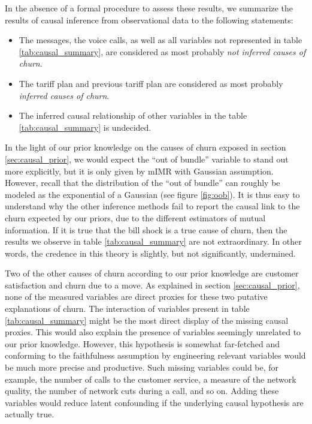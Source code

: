 In the absence of a formal procedure to assess these results, we summarize the
results of causal inference from observational data to the following statements:

\begin{itemize}
    \item The  messages, the voice calls, as well as all variables not
    represented in table \ref{tab:causal_summary}, are considered as most
    probably \emph{not inferred causes of churn}.
    \item The tariff plan and previous tariff plan are considered as most
    probably \emph{inferred causes of churn}.
    \item The inferred causal relationship of other variables in the table
    \ref{tab:causal_summary} is undecided.
\end{itemize}

In the light of our prior knowledge on the causes of churn exposed in section
\ref{sec:causal_prior}, we would expect the ``out of bundle'' variable to stand
out more explicitly, but it is only given by mIMR with Gaussian assumption.
However, recall that the distribution of the ``out of bundle'' can roughly be
modeled as the exponential of a Gaussian (see figure \ref{fig:oob}). It is thus
easy to understand why the other inference methods fail to report the causal
link to the churn expected by our priors, due to the different estimators of
mutual information. If it is true that the bill shock is a true cause of churn,
then the results we observe in table \ref{tab:causal_summary} are not
extraordinary. In other words, the credence in this theory is slightly, but not
significantly, undermined.

Two of the other causes of churn according to our prior knowledge are customer
satisfaction and churn due to a move. As explained in section
\ref{sec:causal_prior}, none of the measured variables are direct proxies for
these two putative explanations of churn. The interaction of variables present
in table \ref{tab:causal_summary} might be the most direct display of the
missing causal proxies. This would also explain the presence of variables
seemingly unrelated to our prior knowledge. However, this hypothesis is somewhat
far-fetched and conforming to the faithfulness assumption by engineering
relevant variables would be much more precise and productive. Such missing
variables could be, for example, the number of calls to the customer service, a
measure of the network quality, the number of network cuts during a call, and so
on. Adding these variables would reduce latent confounding if the underlying
causal hypothesis are actually true.

